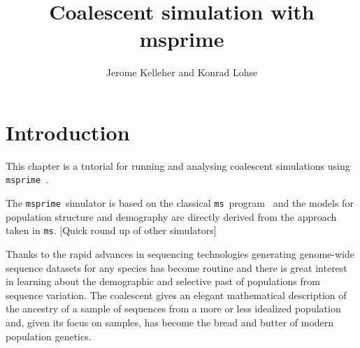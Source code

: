\documentclass[graybox]{svmult}
\newcommand{\msprime}[0]{\texttt{msprime}}
\newcommand{\ms}[0]{\texttt{ms}}
\begin{document}
\title*{Coalescent simulation with msprime}
\author{Jerome Kelleher and Konrad Lohse}
%
%
\maketitle





\section{Introduction}
\label{sec:introduction}

This chapter is a tutorial for running and analysing coalescent simulations
using \msprime~\citep{kelleher2016efficient}.

The \msprime\ simulator is based on the classical \ms\
program~\citep{hudson2002generating} and the models for population
structure and demography are directly derived from the approach taken
in \ms. [Quick round up of other simulators]


Thanks to the rapid advances in sequencing technologies generating
genome-wide sequence datasets for any species has become routine and
there is great interest in learning about the demographic and selective
past of populations from sequence variation. The coalescent gives an
elegant mathematical description of the ancestry of a sample of
sequences from a more or less idealized population and, given its focus
on samples, has become the bread and butter of modern population
genetics.
\end{document}
